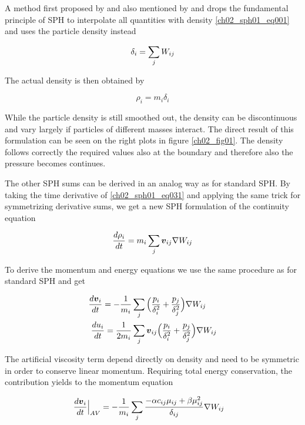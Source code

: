 A method first proposed by \citep{Ott:2003p3727} and also mentioned by \citep{Solenthaler:2008p3720} and \citep{Price:2004p2613} drops the fundamental principle of SPH to interpolate all quantities with density \ref{ch02_sph01_eq001} and uses the particle density instead 

\begin{equation}
\label{ch02_sph01_eq030}
\delta_i = \sum_{j} W_{ij}
\end{equation}

The actual density is then obtained by 

\begin{equation}
\label{ch02_sph01_eq031}
\rho_i = m_i \delta_i
\end{equation}

While the particle density is still smoothed out, the density can be discontinuous and vary largely if particles of different masses interact. The direct result of this formulation can be seen on the right plots in figure \ref{ch02_fig01}. The density follows correctly the required values also at the boundary and therefore also the pressure becomes continues. 

The other SPH sums can be derived in an analog way as for standard SPH. By taking the time derivative of \ref{ch02_sph01_eq031} and applying the same trick for symmetrizing derivative sums, we get a new SPH formulation of the continuity equation 

\begin{equation}
\label{ch02_sph01_eq032}
\frac{d \rho_i}{dt} = m_i \sum_j \boldsymbol{v}_{ij} \nabla W_{ij}
\end{equation}

To derive the momentum and energy equations we use the same procedure as for standard SPH and get 

\begin{align}
\label{ch02_sph01_eq033}
\frac{d \boldsymbol{v}_i }{dt} = - \frac{1}{m_i} & \sum_{j} \Big( \frac{p_i}{\delta_i^2} + \frac{p_j}{\delta_j^2} \Big) \nabla W_{ij} \\
\frac{du_i}{dt} = \frac{1}{2 m_i} & \sum_{j} \boldsymbol{v}_{ij} \Big( \frac{p_i}{\delta_i^2}  + \frac{p_j}{\delta_j^2} \Big)  \nabla W_{ij} 
\end{align}

The artificial viscosity term depend directly on density and need to be symmetric in order to conserve linear momentum. Requiring total energy conservation, the contribution yields  to the momentum equation

\begin{align}
\label{ch02_sph01_eq034}
\frac{d \boldsymbol{v}_i }{dt} \Big|_{AV} = - \frac{1}{m_i} & \sum_{j} \frac{- \alpha c_{ij} \mu_{ij} +  \beta \mu_{ij}^2 }{\delta_{ij} } \nabla W_{ij}
\end{align}

